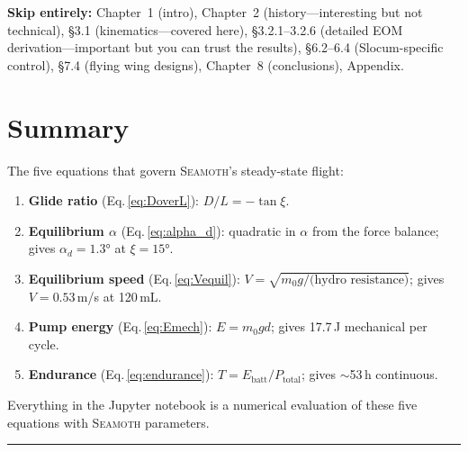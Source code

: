 \documentclass[11pt,a4paper]{article}
\newcommand{\seamoth}{\textsc{Seamoth}}
\begin{document}
\textbf{Skip entirely:} Chapter~1 (intro), Chapter~2 (history---interesting but
not technical), \S3.1 (kinematics---covered here), \S3.2.1--3.2.6 (detailed EOM
derivation---important but you can trust the results), \S6.2--6.4 (Slocum-specific
control), \S7.4 (flying wing designs), Chapter~8 (conclusions), Appendix.


\section*{Summary}

The five equations that govern \seamoth{}'s steady-state flight:

\begin{enumerate}
  \item \textbf{Glide ratio} (Eq.\,\ref{eq:DoverL}):
    $D/L = -\tan\xi$.

  \item \textbf{Equilibrium $\alpha$} (Eq.\,\ref{eq:alpha_d}):
    quadratic in $\alpha$ from the force balance; gives $\alpha_d=1.3°$ at $\xi=15°$.

  \item \textbf{Equilibrium speed} (Eq.\,\ref{eq:Vequil}):
    $V=\sqrt{m_0 g/\text{(hydro resistance)}}$; gives $V=0.53$\,m/s at 120\,mL.

  \item \textbf{Pump energy} (Eq.\,\ref{eq:Emech}):
    $E=m_0 g d$; gives 17.7\,J mechanical per cycle.

  \item \textbf{Endurance} (Eq.\,\ref{eq:endurance}):
    $T=E_\text{batt}/P_\text{total}$; gives $\sim$53\,h continuous.
\end{enumerate}

Everything in the Jupyter notebook is a numerical evaluation of these five equations
with \seamoth{} parameters.

\vspace{1em}\hrule\vspace{1em}
\end{document}
